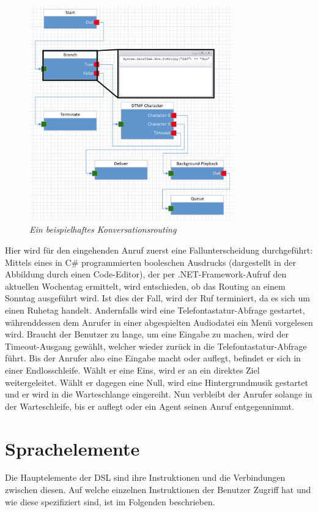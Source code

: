 \begin{figure} %
	\centering
		\includegraphics[width=0.79\textwidth]{img/ExampleFlowCodeHighlighted.png}
	\caption[Beispiel für ein Konversationsrouting]{\textit{Ein beispielhaftes Konversationsrouting}}
	\label{fig:ExampleRouting}
\end{figure}
\noindent Hier wird für den eingehenden Anruf zuerst eine Fallunterscheidung durchgeführt: Mittels eines in C\# programmierten booleschen Ausdrucks (dargestellt in der Abbildung durch einen Code-Editor), der per .NET-Framework-Aufruf den aktuellen Wochentag ermittelt, wird entschieden, ob das Routing an einem Sonntag ausgeführt wird. Ist dies der Fall, wird der Ruf terminiert, da es sich um einen Ruhetag handelt. Andernfalls wird eine Telefontastatur-Abfrage gestartet, währenddessen dem Anrufer in einer abgespielten Audiodatei ein Menü vorgelesen wird. Braucht der Benutzer zu lange, um eine Eingabe zu machen, wird der Timeout-Ausgang gewählt, welcher wieder zurück in die Telefontastatur-Abfrage führt. Bis der Anrufer also eine Eingabe macht oder auflegt, befindet er sich in einer Endlosschleife. Wählt er eine Eins, wird er an ein direktes Ziel weitergeleitet. Wählt er dagegen eine Null, wird eine Hintergrundmusik gestartet und er wird in die Warteschlange eingereiht. Nun verbleibt der Anrufer solange in der Warteschleife, bis er auflegt oder ein Agent seinen Anruf entgegennimmt.  

\section{Sprachelemente}
\label{sec:Sprachelemente}
Die Hauptelemente der DSL sind ihre Instruktionen und die Verbindungen zwischen diesen. Auf welche einzelnen Instruktionen der Benutzer Zugriff hat und wie diese spezifiziert sind, ist im Folgenden beschrieben. 

